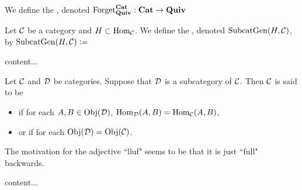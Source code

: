 \documentclass{book}
\begin{document}
	\begin{defn}
		We define the , denoted $\text{Forget}^{\operatorname*{\text{\textbf{Cat}}}}_{\text{\textbf{Quiv}}}: \operatorname*{\text{\textbf{Cat}}} \rightarrow \text{\textbf{Quiv}}$
	\end{defn}
	
	\begin{defn}
		Let $\mathcal{C}$ be a category and $H \subset \operatorname{Hom}_{\mathcal{C}}$. We define the , denoted $\operatorname{SubcatGen}(H, \mathcal{C})$, by $\operatorname{SubcatGen}(H, \mathcal{C}) \vcentcolon= $
	\end{defn}
	
	\begin{ex}
		content...
	\end{ex}
	\begin{defn}
		
	\end{defn}
	
	
	
	
	
	
	
	
	
	
	\begin{defn}
		Let $\mathcal{C}$ and $\mathcal{D}$ be categories. Suppose that $\mathcal{D}$ is a subcategory of $\mathcal{C}$. Then $\mathcal{C}$ is said to be 
		\begin{itemize}
			\item {} if for each $A, B \in \operatorname{Obj}(\mathcal{D})$, $\operatorname{Hom}_{\mathcal{D}}(A,B) = \operatorname{Hom}_{\mathcal{C}}(A,B)$,
			\item {} or  if for each $\operatorname{Obj}(\mathcal{D}) = \operatorname{Obj}(\mathcal{C})$.
		\end{itemize}
	\end{defn}
	
	\begin{note}
		The motivation for the adjective ``lluf" seems to be that it is just ``full" backwards.  
	\end{note}
	
	\begin{ex}
		content...
	\end{ex}
	
	
	
\end{document}
